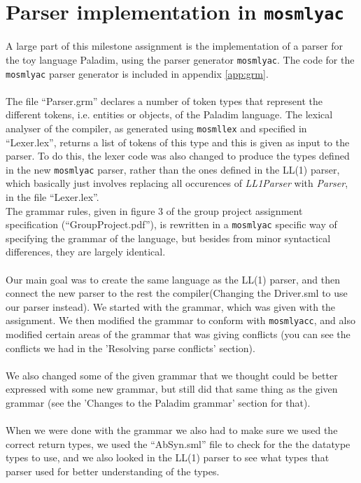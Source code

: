 \documentclass[12pt,a4paper]{article}
\begin{document}
\section{Parser implementation in \texttt{mosmlyac}}
A large part of this milestone assignment is the implementation of a parser for
the toy language \textsf{Paladim}, using the parser generator \texttt{mosmlyac}.
The code for the \texttt{mosmlyac} parser generator is included in appendix
\ref{app:grm}.\\
\\
The file ``Parser.grm'' declares a number of token types that represent the
different tokens, i.e. entities or objects, of the \textsf{Paladim} language.
The lexical analyser of the compiler, as generated using \texttt{mosmllex} and
specified in ``Lexer.lex'', returns a list of tokens of this type and this is
given as input to the parser. To do this, the lexer code was also changed to
produce the types defined in the new \texttt{mosmlyac} parser, rather than the
ones defined in the LL(1) parser, which basically just involves replacing all
occurences of \emph{LL1Parser} with \emph{Parser}, in the file ``Lexer.lex''.\\
The grammar rules, given in figure 3 of the group project assignment
specification (``GroupProject.pdf''), is rewritten in a \texttt{mosmlyac}
specific way of specifying the grammar of the language, but besides from minor
syntactical differences, they are largely identical.\\
\\
Our main goal was to create the same language as the LL(1) parser, and then 
connect the new parser to the rest the compiler(Changing the Driver.sml to use our parser instead). 
We started with the grammar, which was given with the assignment. We then modified the
grammar to conform with \texttt{mosmlyacc}, and also modified certain areas of
the grammar that was giving conflicts (you can see the conflicts we had in the
'Resolving parse conflicts' section).\\
\\
We also changed some of the given grammar that we thought could be better
expressed with some new grammar, but still did that same thing as the given
grammar (see the 'Changes to the \textsf{Paladim} grammar' section for that).\\
\\
When we were done with the grammar we also had to make sure we used the correct
return types, we used the ``AbSyn.sml'' file to check for the the datatype types
to use, and we also looked in the LL(1) parser to see what types that parser
used for better understanding of the types.
\end{document}
